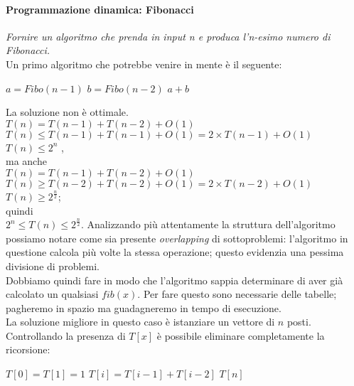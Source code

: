 \paragraph{Programmazione dinamica: Fibonacci} \textit{Fornire un algoritmo che prenda in input n e produca l'n-esimo numero di Fibonacci.}\\
Un primo algoritmo che potrebbe venire in mente è il seguente:
\begin{algorithmic}
		\EndIf
		\State $ a = Fibo(n-1) $
		\State $ b = Fibo(n-2) $
		\State \Return $ a+b $
	\EndFunction
\end{algorithmic}
La soluzione non è ottimale.\\
$ T(n) = T(n-1)+T(n-2)+ O(1) $\\
$ T(n) \le T(n-1) + T(n-1) + O(1)  = 2 \times T(n-1) + O(1)$\\
$ T(n) \le 2^{n} $ ,\\
ma anche\\
$ T(n) = T(n-1)+T(n-2)+ O(1) $\\
$ T(n) \ge T(n-2) + T(n-2) + O(1)  = 2 \times T(n-2) + O(1)$\\
$ T(n) \ge 2^{\frac{n}{2}}$;\\
quindi\\
$ 2^{n} \le T(n) \le 2^{\frac{n}{2}}$.
Analizzando più attentamente la struttura dell'algoritmo possiamo notare come sia presente \textit{overlapping} di sottoproblemi: l'algoritmo in questione calcola più volte la stessa operazione; questo evidenzia una pessima divisione di problemi.\\
Dobbiamo quindi fare in modo che l'algoritmo sappia determinare di aver già calcolato un qualsiasi $ fib(x) $. Per fare questo sono necessarie delle tabelle; pagheremo in spazio ma guadagneremo in tempo di esecuzione.\\
La soluzione migliore in questo caso è istanziare un vettore di $ n $ posti. Controllando la presenza di $ T[x] $ è possibile eliminare completamente la ricorsione:
\begin{algorithmic}
		\State $ T[0] = T[1] = 1 $
			\State $ T[i] = T[i-1] + T[i-2] $
		\EndFor
		\Return $ T[n] $
	\EndFunction
\end{algorithmic}